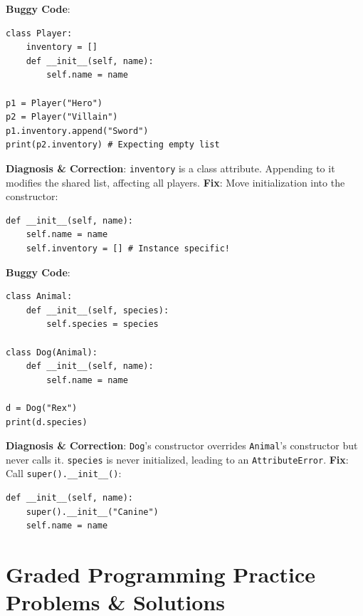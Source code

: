\begin{debuggingbox}
\textbf{Buggy Code}:
\begin{lstlisting}[language=Python3]
class Player:
    inventory = []
    def __init__(self, name):
        self.name = name

p1 = Player("Hero")
p2 = Player("Villain")
p1.inventory.append("Sword")
print(p2.inventory) # Expecting empty list
\end{lstlisting}
\textbf{Diagnosis \& Correction}:
\texttt{inventory} is a class attribute. Appending to it modifies the shared list, affecting all players.
\textbf{Fix}: Move initialization into the constructor:
\begin{lstlisting}[language=Python3]
def __init__(self, name):
    self.name = name
    self.inventory = [] # Instance specific!
\end{lstlisting}
\end{debuggingbox}

\begin{debuggingbox}
\textbf{Buggy Code}:
\begin{lstlisting}[language=Python3]
class Animal:
    def __init__(self, species):
        self.species = species

class Dog(Animal):
    def __init__(self, name):
        self.name = name

d = Dog("Rex")
print(d.species)
\end{lstlisting}
\textbf{Diagnosis \& Correction}:
\texttt{Dog}'s constructor overrides \texttt{Animal}'s constructor but never calls it. \texttt{species} is never initialized, leading to an \texttt{AttributeError}.
\textbf{Fix}: Call \texttt{super().\_\_init\_\_()}:
\begin{lstlisting}[language=Python3]
def __init__(self, name):
    super().__init__("Canine")
    self.name = name
\end{lstlisting}
\end{debuggingbox}

\section{Graded Programming Practice Problems \& Solutions}


